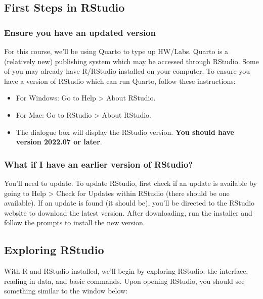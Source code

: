 \documentclass[
  letterpaper,
  DIV=11,
  numbers=noendperiod]{scrartcl}
\begin{document}
\subsection{First Steps in RStudio}\label{first-steps-in-rstudio}

\subsubsection{Ensure you have an updated
version}\label{ensure-you-have-an-updated-version}

For this course, we'll be using Quarto to type up HW/Labs. Quarto is a
(relatively new) publishing system which may be accessed through
RStudio. Some of you may already have R/RStudio installed on your
computer. To ensure you have a version of RStudio which can run Quarto,
follow these instructions:

\begin{itemize}
\item
  For Windows: Go to Help \textgreater{} About RStudio.
\item
  For Mac: Go to RStudio \textgreater{} About RStudio.
\item
  The dialogue box will display the RStudio version. \textbf{You should
  have version 2022.07 or later}.
\end{itemize}

\subsubsection{What if I have an earlier version of
RStudio?}\label{what-if-i-have-an-earlier-version-of-rstudio}

You'll need to update. To update RStudio, first check if an update is
available by going to Help \textgreater{} Check for Updates within
RStudio (there should be one available). If an update is found (it
should be), you'll be directed to the RStudio website to download the
latest version. After downloading, run the installer and follow the
prompts to install the new version.

\subsection{Exploring RStudio}\label{exploring-rstudio}

With R and RStudio installed, we'll begin by exploring RStudio: the
interface, reading in data, and basic commands. Upon opening RStudio,
you should see something similar to the window below:
\end{document}
